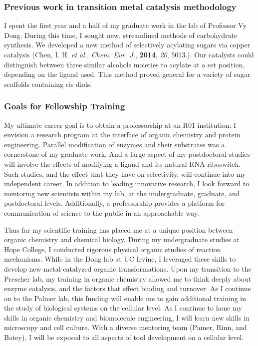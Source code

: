\documentclass[11pt]{article}
\begin{document}
\subsubsection*{Previous work in transition metal catalysis methodology}
I spent the first year and a half of my graduate work in the lab of Professor Vy Dong. During this time, I sought new, streamlined methods of carbohydrate synthesis. We developed a new method of selectively acylating sugars via copper catalysis (Chen, I. H. \textit{et al.}, \textit{Chem. Eur. J.}, \textbf{2014}, \textit{20}, 5013.). Our catalysts could distinguish between three similar alcohols moieties to acylate at a set position, depending on the ligand used. This method proved general for a variety of sugar scaffolds containing cis diols.

\subsubsection*{Goals for Fellowship Training}
My ultimate career goal is to obtain a professorship at an R01 institution. I envision a research program at the interface of organic chemistry and protein engineering. Parallel modification of enzymes and their substrates was a cornerstone of my graduate work. And a large aspect of my postdoctoral studies will involve the effects of modifying a ligand and its natural RNA riboswitch. Such studies, and the effect that they have on selectivity, will continue into my independent career. In addition to leading innovative research, I look forward to mentoring new scientists within my lab, at the undergraduate, graduate, and postdoctoral levels. Additionally, a professorship provides a platform for communication of science to the public in an approachable way.

Thus far my scientific training has placed me at a unique position between organic chemistry and chemical biology. During my undergraduate studies at Hope College, I conducted rigorous physical organic studies of reaction mechanisms. While in the Dong lab at UC Irvine, I leveraged these skills to develop new metal-catalyzed organic transformations. Upon my transition to the Prescher lab, my training in organic chemistry allowed me to think deeply about enzyme catalysis, and the factors that effect binding and turnover. As I continue on to the Palmer lab, this funding will enable me to gain additional training in the study of biological systems on the cellular level. As I continue to hone my skills in organic chemistry and biomolecule engineering, I will learn new skills in microscopy and cell culture. With a diverse mentoring team (Pamer, Rinn, and Batey), I will be exposed to all aspects of tool development on a cellular level.
\end{document}
